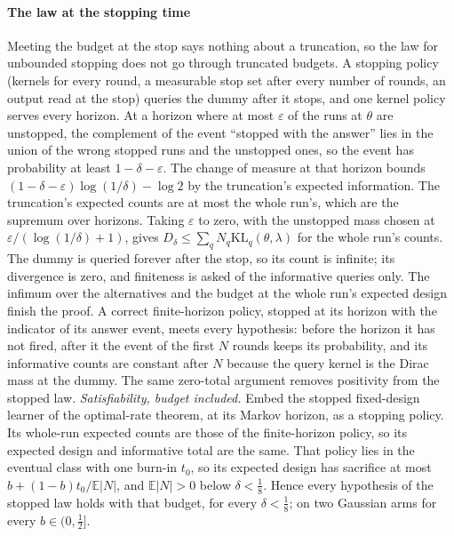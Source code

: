 \paragraph{The law at the stopping time} Meeting the budget at the stop says nothing about a
truncation, so the law for unbounded stopping does not go through truncated budgets. A stopping
policy (kernels for every round, a measurable stop set after every number of rounds, an output
read at the stop) queries the dummy after it stops, and one kernel policy serves every horizon.
At a horizon where at most $\varepsilon$ of the runs at $\theta$ are unstopped, the complement of
the event ``stopped with the answer'' lies in the union of the wrong stopped runs and the
unstopped ones, so the event has probability at least $1-\delta-\varepsilon$. The change of
measure at that horizon bounds $(1-\delta-\varepsilon)\log(1/\delta)-\log2$ by the truncation's
expected information. The truncation's expected counts are at most the whole run's, which are
the supremum over horizons. Taking $\varepsilon$ to zero, with the unstopped mass chosen at
$\varepsilon/(\log(1/\delta)+1)$, gives $D_\delta\le\sum_qN_q\mathrm{KL}_q(\theta,\lambda)$ for the
whole run's counts. The dummy is queried forever after the stop, so its count is infinite; its
divergence is zero, and finiteness is asked of the informative queries only. The infimum over
the alternatives and the budget at the whole run's expected design finish the proof. A correct
finite-horizon policy, stopped at its horizon with the indicator of its answer event, meets every
hypothesis: before the horizon it has not fired, after it the event of the first $N$ rounds keeps
its probability, and its informative counts are constant after $N$ because the query kernel is
the Dirac mass at the dummy. The same zero-total argument removes positivity from the stopped law.
\emph{Satisfiability, budget included.} Embed the stopped fixed-design learner of the optimal-rate
theorem, at its Markov horizon, as a stopping policy. Its whole-run expected counts are those of
the finite-horizon policy, so its expected design and informative total are the same. That policy
lies in the eventual class with one burn-in $t_0$, so its expected design has sacrifice at most
$b+(1-b)t_0/\mathbb E|N|$, and $\mathbb E|N|>0$ below $\delta<\frac18$. Hence every hypothesis of the
stopped law holds with that budget, for every $\delta<\frac18$; on two Gaussian arms for every
$b\in(0,\frac12]$.

